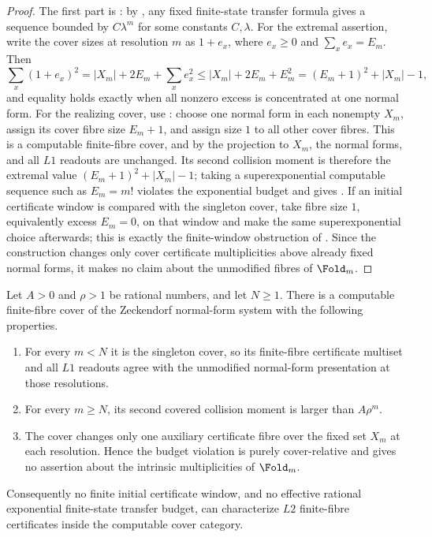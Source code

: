\begin{proof}
The first part is : by
, any
fixed finite-state transfer formula gives a sequence bounded by
\(C\lambda^m\) for some constants \(C,\lambda\).  For the extremal assertion,
write the cover sizes at resolution \(m\) as \(1+e_x\), where
\(e_x\ge0\) and \(\sum_x e_x=E_m\).  Then
\[
  \sum_x(1+e_x)^2=|X_m|+2E_m+\sum_xe_x^2
  \le |X_m|+2E_m+E_m^2=(E_m+1)^2+|X_m|-1,
\]
and equality holds exactly when all nonzero excess is concentrated at one normal
form.  For the realizing cover, use :
choose one normal form in each
nonempty \(X_m\), assign its cover fibre size \(E_m+1\), and assign size \(1\) to
all other cover fibres.  This is a computable finite-fibre cover, and by
 the projection to \(X_m\), the normal forms,
and all \(L1\) readouts are unchanged.  Its second collision moment is therefore
the extremal value \((E_m+1)^2+|X_m|-1\); taking a superexponential computable
sequence such as \(E_m=m!\) violates the exponential budget and gives
.  If an initial certificate window is compared
with the singleton cover, take fibre size \(1\), equivalently excess \(E_m=0\),
on that window and make the same superexponential choice afterwards; this is
exactly the finite-window obstruction of
.  Since the construction
changes only cover certificate multiplicities above already fixed normal forms,
it makes no claim about the unmodified fibres of \(\Fold_m\).
\end{proof}

\begin{theorem}
\label{thm:L2-quantitative-budget-obstruction}
Let \(A>0\) and \(\rho>1\) be rational numbers, and let \(N\ge1\).  There is a
computable finite-fibre cover of the Zeckendorf normal-form system with the
following properties.
\begin{enumerate}
\item For every \(m<N\) it is the singleton cover, so its finite-fibre
  certificate multiset and all \(L1\) readouts agree with the unmodified
  normal-form presentation at those resolutions.
\item For every \(m\ge N\), its second covered collision moment is larger than
  \(A\rho^m\).
\item The cover changes only one auxiliary certificate fibre over the fixed set
  \(X_m\) at each resolution.  Hence the budget violation is purely
  cover-relative and gives no assertion about the intrinsic multiplicities of
  \(\Fold_m\).
\end{enumerate}
Consequently no finite initial certificate window, and no effective rational
exponential finite-state transfer budget, can characterize \(L2\) finite-fibre
certificates inside the computable cover category.
\end{theorem}

